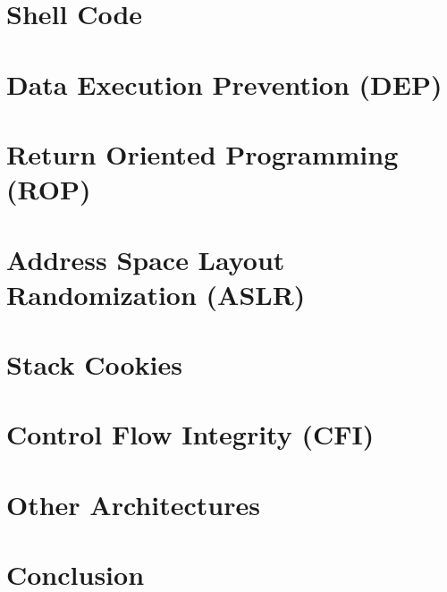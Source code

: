 \documentclass[article]{uibk}
\begin{document}
\section{Shell Code}

\section{Data Execution Prevention (DEP)}

\section{Return Oriented Programming (ROP)}

\section{Address Space Layout Randomization (ASLR)}

\section{Stack Cookies}

\section{Control Flow Integrity (CFI)}

\section{Other Architectures}

\section{Conclusion}


\end{document}
